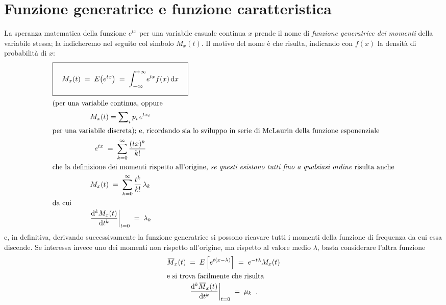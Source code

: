 \section{Funzione generatrice e funzione   caratteristica}%
%
%
\label{ch:6.fugeca}
La speranza matematica della funzione $e^{tx}$ per una
variabile casuale continua $x$ prende il nome di
\emph{funzione generatrice dei momenti} della variabile
stessa; la indicheremo nel seguito col simbolo $M_x(t)$.  Il
motivo del nome \`e che risulta, indicando con $f(x)$ la
densit\`a di probabilit\`a di $x$:
\begin{gather}
  \boxed{ \rule[-6mm]{0mm}{14mm} \quad
    M_x(t) \; = \; E \bigl( e^{tx} \bigr) \; = \;
      \int_{-\infty}^{+\infty} \! e^{t x} f(x) \, \de x
      \quad } \label{eq:6.fugemo} \\
  \intertext{(per una variabile continua, oppure}
  M_x(t) = \sum\nolimits_i p_i \, e^{t x_i} \notag \\
  \intertext{per una variabile discreta); e, ricordando sia
    lo sviluppo in serie di McLaurin della funzione
    esponenziale}
  e^{tx} \; = \; \sum_{k=0}^\infty \frac{(tx)^k}{k!}
    \notag \\
  \intertext{che la definizione dei momenti rispetto
    all'origine, \emph{se questi esistono tutti fino a
    qualsiasi ordine} risulta anche}
  M_x(t) \; = \; \sum_{k=0}^\infty \frac{t^k}{k!} \,
    \lambda_k \notag \\
  \intertext{da cui}
  \left. \frac{\de^k M_x(t)}{\de t^k} \right|_{t=0} \; =
    \; \lambda_k \notag
\end{gather}
e, in definitiva, derivando successivamente la funzione
generatrice si possono ricavare tutti i momenti della
funzione di frequenza da cui essa discende.  Se interessa
invece uno dei momenti non rispetto all'origine, ma rispetto
al valore medio $\lambda$, basta considerare l'altra
funzione
\begin{gather}
  \ob{M}_x(t) \; = \; E \left[ e^{t(x - \lambda)}
    \right] \; = \; e^{-t \lambda} M_x(t)
    \label{eq:6.fugemm} \\
  \intertext{e si trova facilmente che risulta}
  \left. \frac{\de^k \ob{M}_x(t)}{\de t^k}
    \right|_{t=0} \; = \;\mu_k \peq . \notag
\end{gather}%

